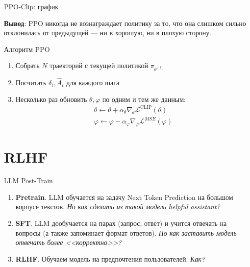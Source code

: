 \documentclass[aspectratio=169,12pt,t,compress]{beamer}
\begin{document}
\begin{frame}{PPO-Clip: график}

	\textbf{Вывод}: PPO никогда не вознаграждает политику за то, что она слишком сильно отклонилась от предыдущей --- ни в хорошую, ни в плохую сторону.
\end{frame}

\begin{frame}{Алгоритм PPO}
	\begin{enumerate}
		\item Собрать $N$ траекторий с текущей политикой $\pi_{\theta^{(k)}}$
		\item<2-> Посчитать $\delta_t, \hat A_{t}$ для каждого шага
		\item<3-> Несколько раз обновить $\theta, \varphi$ по одним и тем же данным:
		      $$
			      \begin{gathered}
				      \theta \leftarrow \theta + \alpha_{\theta} \nabla_\theta \mathcal{L}^{\text{CLIP}}(\theta)\\
				      \varphi \leftarrow \varphi - \alpha_{\varphi} \nabla_\varphi \mathcal{L}^{MSE}(\varphi)
			      \end{gathered}
		      $$
	\end{enumerate}
\end{frame}


\section{RLHF}



\begin{frame}{LLM Post-Train}
	\begin{enumerate}
		\item \textbf{Pretrain}. LLM обучается на задачу Next Token Prediction на большом корпусе текстов. \textit{Но как сделать из такой модель helpful assistant?}
		\item<2-> \textbf{SFT}. LLM дообучается на парах (запрос, ответ) и учится отвечать на вопросы (а также запоминает формат ответов). \textit{Но как заставить модель отвечать более <<корректно>>?}
		\item<3-> \textbf{RLHF}. Обучаем модель на предпочтения пользователей. \textit{Как?}
	\end{enumerate}

\end{frame}
\end{document}
